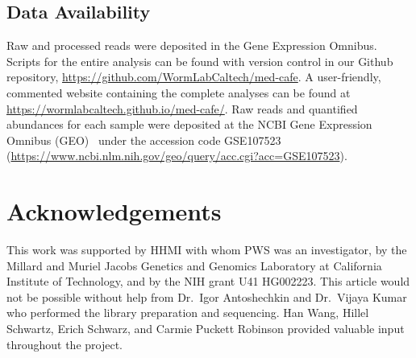 \documentclass[8pt, twocolumn]{article}
\begin{document}
\subsection*{Data Availability}
Raw and processed reads were deposited in the Gene Expression Omnibus. Scripts
for the entire analysis can be found with version control in our Github
repository, \url{https://github.com/WormLabCaltech/med-cafe}. A user-friendly,
commented website containing the complete analyses can be found at
\url{https://wormlabcaltech.github.io/med-cafe/}. Raw reads and quantified
abundances for each sample were deposited at the NCBI Gene Expression Omnibus
(GEO)~\cite{Edgar2002} under the accession code GSE107523
(\url{https://www.ncbi.nlm.nih.gov/geo/query/acc.cgi?acc=GSE107523}).

\section*{Acknowledgements}
This work was supported by HHMI with whom PWS was an investigator, by the
Millard and Muriel Jacobs Genetics and Genomics Laboratory at California
Institute of Technology, and by the NIH grant U41 HG002223. This article would
not be possible without help from Dr.\ Igor Antoshechkin and Dr.\ Vijaya Kumar
who performed the library preparation and sequencing. Han Wang, Hillel Schwartz,
Erich Schwarz, and Carmie Puckett Robinson provided valuable input throughout
the project.



\end{document}
